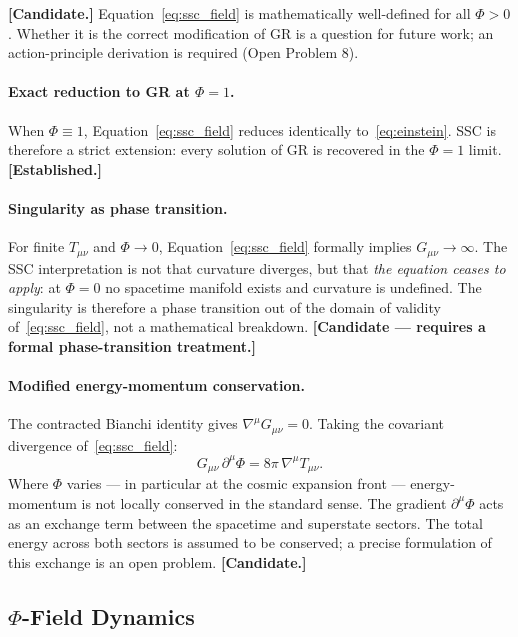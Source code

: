 \documentclass[12pt,a4paper]{article}
\begin{document}
\textbf{[Candidate.]} Equation~\eqref{eq:ssc_field} is
mathematically well-defined for all $\Phi > 0$. Whether it is the
correct modification of GR is a question for future work; an
action-principle derivation is required (Open Problem 8).

\paragraph{Exact reduction to GR at $\Phi = 1$.}
When $\Phi \equiv 1$, Equation~\eqref{eq:ssc_field} reduces
identically to~\eqref{eq:einstein}. SSC is therefore a strict
extension: every solution of GR is recovered in the $\Phi = 1$
limit. \textbf{[Established.]}

\paragraph{Singularity as phase transition.}
For finite $T_{\mu\nu}$ and $\Phi \to 0$,
Equation~\eqref{eq:ssc_field} formally implies $G_{\mu\nu} \to
\infty$. The SSC interpretation is not that curvature diverges, but
that \emph{the equation ceases to apply}: at $\Phi = 0$ no
spacetime manifold exists and curvature is undefined. The
singularity is therefore a phase transition out of the domain of
validity of~\eqref{eq:ssc_field}, not a mathematical breakdown.
\textbf{[Candidate — requires a formal phase-transition
treatment.]}

\paragraph{Modified energy-momentum conservation.}
The contracted Bianchi identity gives $\nabla^\mu G_{\mu\nu} = 0$.
Taking the covariant divergence of~\eqref{eq:ssc_field}:
\begin{equation}
  G_{\mu\nu}\,\partial^\mu\Phi
  = 8\pi\,\nabla^\mu T_{\mu\nu}.
  \label{eq:modified_conservation}
\end{equation}
Where $\Phi$ varies — in particular at the cosmic expansion front
— energy-momentum is not locally conserved in the standard sense.
The gradient $\partial^\mu\Phi$ acts as an exchange term between the
spacetime and superstate sectors. The total energy across both
sectors is assumed to be conserved; a precise formulation of this
exchange is an open problem. \textbf{[Candidate.]}

\subsection{\texorpdfstring{$\Phi$}{Phi}-Field Dynamics}
\end{document}
